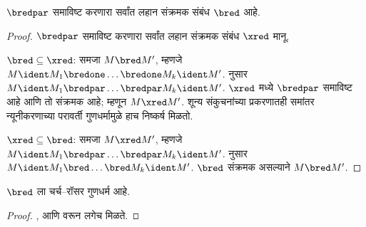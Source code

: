 \documentclass[../../../include/open-logic-section]{subfiles}
\begin{document}
\begin{lem}
  $\bredpar$ समाविष्ट करणारा सर्वांत लहान संक्रमक
  संबंध $\bred$ आहे.
\end{lem}

\begin{proof}
  $\bredpar$ समाविष्ट करणारा सर्वांत लहान संक्रमक
  संबंध $\xred$ मानू.

  $\bred \subseteq \xred$: समजा $M \bred M'$,
  म्हणजे $M \ident M_1 \bredone \dots \bredone M_k \ident M'$.
   नुसार $M \ident M_1 \bredpar
  \dots \bredpar M_k \ident M'$. $\xred$ मध्ये
  $\bredpar$ समाविष्ट आहे आणि तो संक्रमक आहे;
  म्हणून $M \xred M'$. शून्य संकुचनांच्या प्रकरणातही
  समांतर न्यूनीकरणाच्या परावर्ती गुणधर्मामुळे हाच निष्कर्ष मिळतो.

  $\xred \subseteq \bred$: समजा $M \xred M'$,
  म्हणजे $M \ident M_1 \bredpar \dots \bredpar M_k \ident M'$.
   नुसार $M \ident M_1 \bred
  \dots \bred M_k \ident M'$. $\bred$ संक्रमक
  असल्याने $M \bred M'$.
\end{proof}

\begin{thm}
  $\bred$ ला चर्च–रॉसर गुणधर्म आहे.
\end{thm}

\begin{proof}
  ,  आणि
   वरून लगेच मिळते.
\end{proof}
\end{document}

